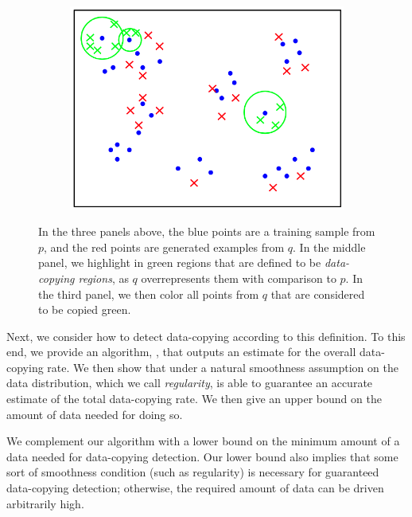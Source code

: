 \begin{figure}[ht]
\begin{subfigure}{0.31\textwidth}
	\end{subfigure}\hspace*{\fill}
	\begin{subfigure}{0.31\textwidth}\includegraphics[width=\linewidth]{data_copy.png}
	\end{subfigure}
	\caption{In the three panels above, the blue points are a training sample from $p$, and the red points are generated examples from $q$. In the middle panel, we highlight in green regions that are defined to be \textit{data-copying regions}, as $q$ overrepresents them with comparison to $p$. In the third panel, we then color all points from $q$ that are considered to be copied green.}
	
	\label{fig:triptic}
\end{figure}

Next, we consider how to detect data-copying according to this definition. To this end, we provide an algorithm, \dc{}, that outputs an estimate for the overall data-copying rate. We then show that under a natural smoothness assumption on the data distribution, which we call \textit{regularity}, \dc{} is able to guarantee an accurate estimate of the total data-copying rate. We then give an upper bound on the amount of data needed for doing so. 

We complement our algorithm with a lower bound on the minimum amount of a data needed for data-copying detection. Our lower bound also implies that some sort of smoothness condition (such as regularity) is necessary for guaranteed data-copying detection; otherwise, the required amount of data can be driven arbitrarily high.

